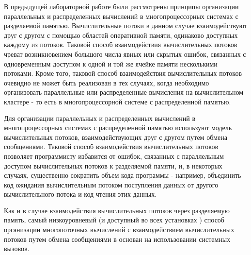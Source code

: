 

В предыдущей лабораторной работе были рассмотрены принципы организации параллельных и распределенных вычислений в многопроцессорных системах с разделяемой памятью. Вычислительные потоки в данном случае взаимодействуют друг с другом с помощью областей оперативной памяти, одинаково доступных каждому из потоков. Таковой способ взаимодействия вычислительных потоков чреват возникновением большого числа явных или скрытых ошибок, связанных с одновременным доступом к одной и той же ячейке памяти несколькими потоками. Кроме того, таковой способ взаимодействия вычислительных потоков очевидно не может быть реализован в тех случаях, когда необходимо организовать параллельные или распределенные вычисления на вычислительном кластере - то есть в многопроцессорной системе с распределенной памятью.

Для организации параллельных и распределенных вычислений в многопроцессорных системах с распределенной памятью используют модель вычислительных потоков, взаимодействующих друг с другом путем обмена сообщениями. Таковой способ взаимодействия вычислительных потоков позволяет программисту избавится от ошибок, связанных с параллельным доступом вычислительных потоков к разделяемой памяти, и, в некоторых случаях, существенно сократить объем кода программы - например, объединить код ожидания вычислительным потоком поступления данных от другого вычислительного потока и код чтения этих данных.


Как и в случае взаимодействия вычислительных потоков через разделяемую память, самый низкоуровневый (и доступный во всех установках \gl) способ организации многопоточных вычислений с взаимодействием вычислительных потоков путем обмена сообщениями в \gl основан на использовании системных вызовов.

